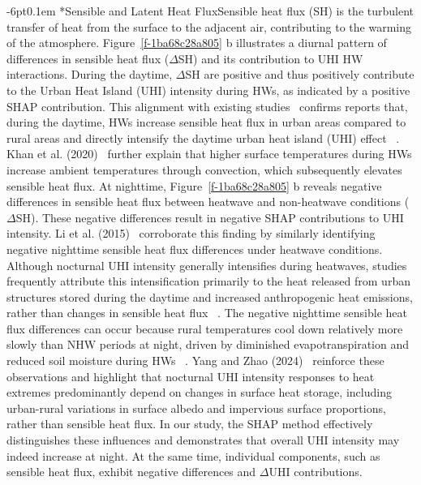 \documentclass[]{nature}
\makeatletter
\renewcommand{\subsubsection}{\@startsection {subsubsection}{2}{0pt}%
    {-6pt}{0.1em}%
    {\small\sffamily\bfseries\itshape}%
    }
\makeatother
\begin{document}
\subsubsection*{Sensible and Latent Heat Flux}Sensible heat flux (SH) is the turbulent transfer of heat from the surface to the adjacent air, contributing to the warming of the atmosphere. Figure~\ref{f-1ba68c28a805} b illustrates a diurnal pattern of differences in sensible heat flux (\ensuremath{\Delta }SH) and its contribution to UHI HW interactions. \mbox{}\protect\newline During the daytime, \ensuremath{\Delta }SH are positive and thus positively contribute to the Urban Heat Island (UHI) intensity during HWs, as indicated by a positive SHAP contribution. This alignment with existing studies\unskip~\cite{2755510:33598941,2755510:33598935}  confirms reports that, during the daytime, HWs increase sensible heat flux in urban areas compared to rural areas and directly intensify the daytime urban heat island (UHI) effect\unskip~\cite{2755510:33598935} . Khan et al. (2020)\unskip~\cite{2755510:33598943}  further explain that higher surface temperatures during HWs increase ambient temperatures through convection, which subsequently elevates sensible heat flux. \mbox{}\protect\newline At nighttime, Figure~\ref{f-1ba68c28a805} b reveals negative differences in sensible heat flux between heatwave and non-heatwave conditions (\ensuremath{\Delta }SH). These negative differences result in negative SHAP contributions to UHI intensity. Li et al. (2015)\unskip~\cite{2755510:33598935}  corroborate this finding by similarly identifying negative nighttime sensible heat flux differences under heatwave conditions. Although nocturnal UHI intensity generally intensifies during heatwaves, studies frequently attribute this intensification primarily to the heat released from urban structures stored during the daytime and increased anthropogenic heat emissions, rather than changes in sensible heat flux\unskip~\cite{2755510:33598928} . The negative nighttime sensible heat flux differences can occur because rural temperatures cool down relatively more slowly than NHW periods at night, driven by diminished evapotranspiration and reduced soil moisture during HWs\unskip~\cite{2755510:33598893} . Yang and Zhao (2024)\unskip~\cite{2755510:33598892}  reinforce these observations and highlight that nocturnal UHI intensity responses to heat extremes predominantly depend on changes in surface heat storage, including urban-rural variations in surface albedo and impervious surface proportions, rather than sensible heat flux. In our study, the SHAP method effectively distinguishes these influences and demonstrates that overall UHI intensity may indeed increase at night. At the same time, individual components, such as sensible heat flux, exhibit negative differences and  \ensuremath{\Delta }UHI contributions.
\end{document}
